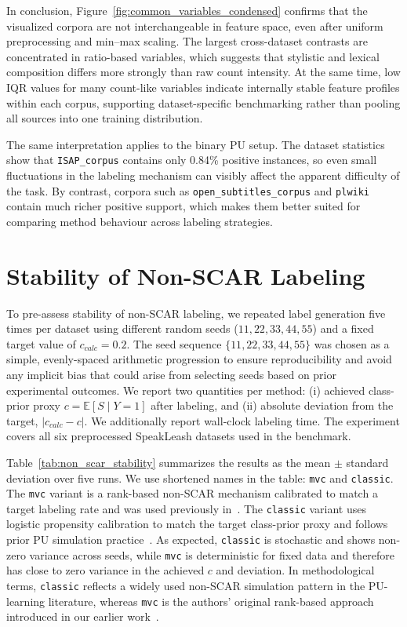 \documentclass[applsci,article,accept,pdftex,moreauthors]{Definitions/mdpi}
\newcommand{\rev}[1]{{#1}}
\begin{document}
In conclusion, Figure~\ref{fig:common_variables_condensed} confirms that the visualized corpora are not interchangeable in feature space, even after uniform preprocessing and min--max scaling. The largest cross-dataset contrasts are concentrated in ratio-based variables, which suggests that stylistic and lexical composition differs more strongly than raw count intensity. At the same time, low IQR values for many count-like variables indicate internally stable feature profiles within each corpus, supporting dataset-specific benchmarking rather than pooling all sources into one training distribution.

\rev{The same interpretation applies to the binary PU setup. The dataset statistics show that \texttt{ISAP\_corpus} contains only 0.84\% positive instances, so even small fluctuations in the labeling mechanism can visibly affect the apparent difficulty of the task. By contrast, corpora such as \texttt{open\_subtitles\_corpus} and \texttt{plwiki} contain much richer positive support, which makes them better suited for comparing method behaviour across labeling strategies.}

\section{Stability of Non-SCAR Labeling}
To pre-assess stability of non-SCAR labeling, we repeated label generation five times per dataset using different random seeds ($11,22,33,44,55$) and a fixed target value of $c_{calc}=0.2$. The seed sequence $\{11, 22, 33, 44, 55\}$ was chosen as a simple, evenly-spaced arithmetic progression to ensure reproducibility and avoid any implicit bias that could arise from selecting seeds based on prior experimental outcomes. We report two quantities per method: (i) achieved class-prior proxy $c=\mathbb{E}[S\mid Y=1]$ after labeling, and (ii) absolute deviation from the target, $|c_{calc}-c|$. We additionally report wall-clock labeling time. The experiment covers all six preprocessed SpeakLeash datasets used in the benchmark.

Table~\ref{tab:non_scar_stability} summarizes the results as the mean $\pm$ standard deviation over five runs. We use shortened names in the table: \texttt{mvc} and \texttt{classic}. The \texttt{mvc} variant is a rank-based non-SCAR mechanism calibrated to match a target labeling rate and was used previously in~\cite{mdai25_mvc}. The \texttt{classic} variant uses logistic propensity calibration to match the target class-prior proxy and follows prior PU simulation practice~\cite{pu_classic_propensity}. As expected, \texttt{classic} is stochastic and shows non-zero variance across seeds, while \texttt{mvc} is deterministic for fixed data and therefore has close to zero variance in the achieved $c$ and deviation. In methodological terms, \texttt{classic} reflects a widely used non-SCAR simulation pattern in the PU-learning literature, whereas \texttt{mvc} is the authors' original rank-based approach introduced in our earlier work~\cite{mdai25_mvc}.
\end{document}
